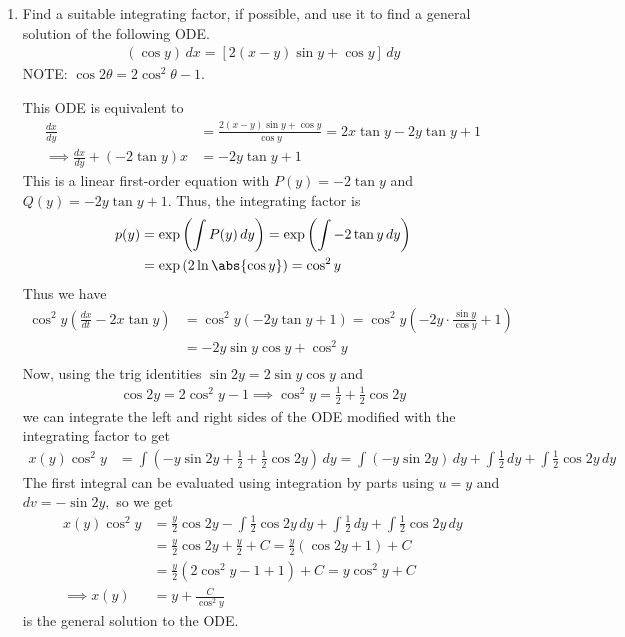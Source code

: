 \documentclass{article}
\begin{document}
\begin{enumerate}
	\item Find a suitable integrating factor, if possible, and use it to find a general solution of the following ODE.
		\begin{align*}
			(\cos y)\, dx = \left[ 2(x-y)\sin y + \cos y \right]\, dy
		\end{align*}
		NOTE: $\cos 2\theta = 2\cos^2\theta-1.$
		\begin{soln}
			This ODE is equivalent to
			\begin{align*}
				\frac{dx}{dy} &= \frac{2(x-y)\sin y + \cos y}{\cos y} = 2x\tan y - 2y\tan y + 1 \\
				\implies \frac{dx}{dy} + (-2\tan y) x &= -2y\tan y + 1
			\end{align*}
			This is a linear first-order equation with $P(y)=-2\tan y$ and $Q(y) = -2y\tan y + 1.$ Thus, the integrating factor is
			\begin{align*}
				p(y) &= \exp\left( \int P(y)\, dy \right) = \exp\left( \int -2\tan y\, dy \right) \\ 
				&= \exp\left( 2\ln\abs{\cos y} \right)= \cos^2 y
			\end{align*}
			Thus we have
			\begin{align*}
				\cos^2 y \left( \frac{dx}{dt} -2x\tan y \right) &= \cos^2y \left( -2y\tan y+ 1 \right) = \cos^2y \left( -2y\cdot \frac{\sin y}{\cos y} + 1 \right) \\
				&= -2y\sin y\cos y + \cos^2y \\
			\end{align*}
			Now, using the trig identities $\sin 2y = 2\sin y\cos y$ and
			\begin{align*}
				\cos 2y = 2\cos^2y - 1 \implies \cos^2y = \frac{1}{2} + \frac{1}{2}\cos 2y
			\end{align*}
			we can integrate the left and right sides of the ODE modified with the integrating factor to get
			\begin{align*}
				x(y) \cos^2y &= \int\left( -y\sin 2y + \frac{1}{2} + \frac{1}{2}\cos 2y \right)\, dy = \int\left( -y\sin 2y \right)\, dy + \int \frac{1}{2}\, dy + \int \frac{1}{2}\cos 2y\, dy
			\end{align*}
			The first integral can be evaluated using integration by parts using $u=y$ and $dv=-\sin 2y,$ so we get 
			\begin{align*}
				x(y)\cos^2 y &= \frac{y}{2}\cos 2y - \int \frac{1}{2}\cos 2y\, dy + \int\frac{1}{2}\, dy + \int\frac{1}{2}\cos 2y\, dy \\
				&= \frac{y}{2}\cos 2y + \frac{y}{2}  + C = \frac{y}{2}\left( \cos 2y + 1 \right) + C \\
				&= \frac{y}{2}\left( 2\cos^2y-1+1 \right) + C = y\cos^2y + C \\
				\implies x(y) &= \boxed{y + \frac{C}{\cos^2 y}}
			\end{align*}
			is the general solution to the ODE.
		\end{soln}


\end{enumerate}
\end{document}
